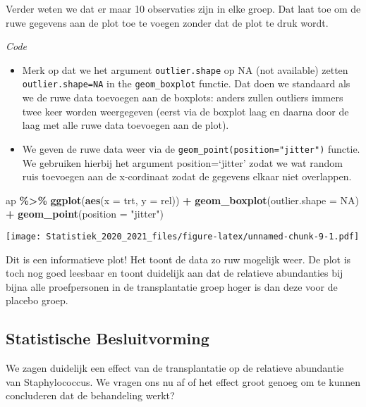 \documentclass[
  12pt,dutch,coursenotes]{book}
\newenvironment{Shaded}{\begin{snugshade}}{\end{snugshade}}
\newcommand{\DataTypeTok}[1]{\textcolor[rgb]{0.13,0.29,0.53}{#1}}
\newcommand{\KeywordTok}[1]{\textcolor[rgb]{0.13,0.29,0.53}{\textbf{#1}}}
\newcommand{\NormalTok}[1]{#1}
\newcommand{\OperatorTok}[1]{\textcolor[rgb]{0.81,0.36,0.00}{\textbf{#1}}}
\newcommand{\OtherTok}[1]{\textcolor[rgb]{0.56,0.35,0.01}{#1}}
\newcommand{\StringTok}[1]{\textcolor[rgb]{0.31,0.60,0.02}{#1}}
\providecommand{\tightlist}{%
  \setlength{\itemsep}{0pt}\setlength{\parskip}{0pt}}
\theoremstyle{definition}
\theoremstyle{definition}
\theoremstyle{definition}
\theoremstyle{remark}
\begin{document}
Verder weten we dat er maar 10 observaties zijn in elke groep. Dat laat toe om de ruwe gegevens aan de plot toe te voegen zonder dat de plot te druk wordt.

\emph{Code}

\begin{itemize}
\tightlist
\item
  Merk op dat we het argument \texttt{outlier.shape} op NA (not available) zetten \texttt{outlier.shape=NA} in the \texttt{geom\_boxplot} functie. Dat doen we standaard als we de ruwe data toevoegen aan de boxplots: anders zullen outliers immers twee keer worden weergegeven (eerst via de boxplot laag en daarna door de laag met alle ruwe data toevoegen aan de plot).
\item
  We geven de ruwe data weer via de \texttt{geom\_point(position="jitter")} functie. We gebruiken hierbij het argument position=`jitter' zodat we wat random ruis toevoegen aan de x-cordinaat zodat de gegevens elkaar niet overlappen.
\end{itemize}

\begin{Shaded}
\begin{Highlighting}[]
\NormalTok{ap }\OperatorTok{\%\textgreater{}\%}\StringTok{ }\KeywordTok{ggplot}\NormalTok{(}\KeywordTok{aes}\NormalTok{(}\DataTypeTok{x =}\NormalTok{ trt, }\DataTypeTok{y =}\NormalTok{ rel)) }\OperatorTok{+}\StringTok{ }\KeywordTok{geom\_boxplot}\NormalTok{(}\DataTypeTok{outlier.shape =} \OtherTok{NA}\NormalTok{) }\OperatorTok{+}\StringTok{ }
\StringTok{    }\KeywordTok{geom\_point}\NormalTok{(}\DataTypeTok{position =} \StringTok{"jitter"}\NormalTok{)}
\end{Highlighting}
\end{Shaded}

\texttt{[image: Statistiek\_2020\_2021\_files/figure-latex/unnamed-chunk-9-1.pdf]}

Dit is een informatieve plot!
Het toont de data zo ruw mogelijk weer. De plot is toch nog goed leesbaar en toont duidelijk aan dat de relatieve abundanties bij bijna alle proefpersonen in de transplantatie groep hoger is dan deze voor de placebo groep.

\hypertarget{statistische-besluitvorming}{%
\subsection{Statistische Besluitvorming}\label{statistische-besluitvorming}}

We zagen duidelijk een effect van de transplantatie op de relatieve abundantie van Staphylococcus.
We vragen ons nu af of het effect groot genoeg om te kunnen concluderen dat de behandeling werkt?
\end{document}
